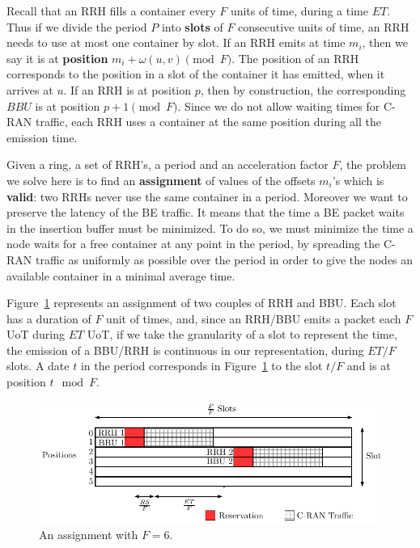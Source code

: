 \documentclass[10pt, conference, letterpaper]{IEEEtran}
\begin{document}
Recall that an RRH fills a container every $F$ units of time, during a time $ET$. 
Thus if we divide the period $P$ into \textbf{slots} of $F$ consecutive units of time, an RRH needs to use at most one container by slot. If an RRH emits at time $m_i$, then we say it is at \textbf{position} $m_i + \omega(u,v)\pmod F$. 
The position of an RRH corresponds to the position in a slot of the container it has emitted, when it arrives at $u$. 
If an RRH is at position $p$, then by construction, the corresponding $BBU$ is at position $p+1\pmod F$. Since we do not allow waiting times for C-RAN traffic, each RRH uses a container at the same position during all the emission time. 

Given a ring, a set of RRH's, a period and an acceleration factor $F$, the problem we solve here is to find an \textbf{assignment} of values of the offsets $m_i$'s which is \textbf{valid}: two RRHs never use the same container in a period. Moreover we want to preserve the latency of the BE traffic. It means that the time a BE packet waits in the insertion buffer must be minimized. To do so, we must minimize the time a node waits for a free container at any point in the period, by spreading the C-RAN traffic as uniformly as possible over the period in order to give the nodes an available container in a minimal average time. 

Figure~\ref{fig:assignment} represents an assignment of two couples of RRH and BBU. Each slot has a duration of $F$ unit of times, and, since an RRH/BBU emits a packet each $F$ UoT during $ET$ UoT, if we take the granularity of a slot to represent the time, the emission of a BBU/RRH is continuous in our representation, during $ET/F$ slots. A date $t$ in the period corresponds in Figure~\ref{fig:assignment} to the slot $t/F$ and is at position $t \mod F$.


\begin{figure}[h!]
\begin{center}   

      \includegraphics[scale=0.65]{assignment}
     \caption{An assignment with $F = 6$.}\label{fig:assignment}
     
\end{center}
  \end{figure}
\end{document}
